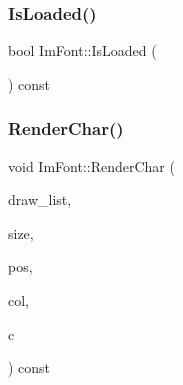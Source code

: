 \mbox{\label{struct_im_font_a97dafa61cc94e84be396d69b0d42b1ce}} 
\subsubsection{\texorpdfstring{Is\+Loaded()}{IsLoaded()}}
{\footnotesize\ttfamily bool Im\+Font\+::\+Is\+Loaded (\begin{DoxyParamCaption}{ }\end{DoxyParamCaption}) const\hspace{0.3cm}{\ttfamily [inline]}}

\mbox{\label{struct_im_font_af602fe8f445ae4142436ee3e6baa3ede}} 
\subsubsection{\texorpdfstring{Render\+Char()}{RenderChar()}}
{\footnotesize\ttfamily void Im\+Font\+::\+Render\+Char (\begin{DoxyParamCaption}\item[{\mbox{\hyperlink{struct_im_draw_list}{Im\+Draw\+List}} $\ast$}]{draw\+\_\+list,  }\item[{float}]{size,  }\item[{\mbox{\hyperlink{struct_im_vec2}{Im\+Vec2}}}]{pos,  }\item[{\mbox{\hyperlink{imgui_8h_a118cff4eeb8d00e7d07ce3d6460eed36}{Im\+U32}}}]{col,  }\item[{unsigned short}]{c }\end{DoxyParamCaption}) const}

\mbox{\label{struct_im_font_a2877acf1cfcd964bc2e7fe600a08849e}} 
